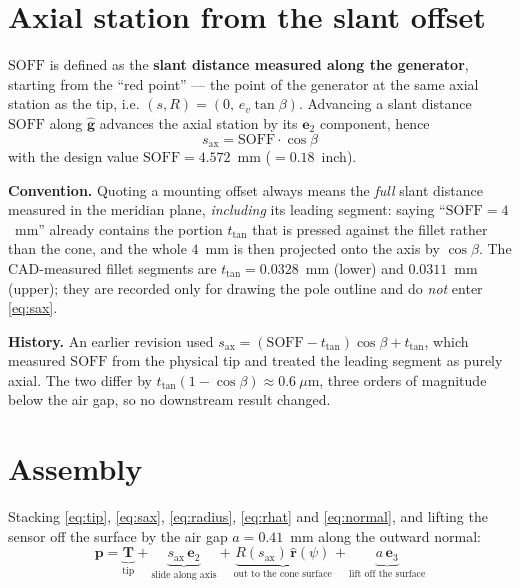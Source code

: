 \documentclass[12pt]{article}
\newcommand{\ehat}[1]{\mathbf{e}_{#1}}
\newcommand{\rhat}{\hat{\mathbf{r}}}
\begin{document}
\section{Axial station from the slant offset}

$\mathrm{SOFF}$ is defined as the \textbf{slant distance measured along the generator},
starting from the ``red point'' --- the point of the generator at the same axial station
as the tip, i.e. $(s,R)=(0,\,e_v\tan\beta)$. Advancing a slant distance
$\mathrm{SOFF}$ along $\hat{\mathbf{g}}$ advances the axial station by its $\ehat{2}$
component, hence
\begin{equation}
\boxed{\ s_{\mathrm{ax}}=\mathrm{SOFF}\cdot\cos\beta\ }
\label{eq:sax}
\end{equation}
with the design value $\mathrm{SOFF}=4.572$~mm ($=0.18$~inch).

\textbf{Convention.} Quoting a mounting offset always means the \emph{full} slant
distance measured in the meridian plane, \emph{including} its leading segment: saying
``$\mathrm{SOFF}=4$~mm'' already contains the portion $t_{\tan}$ that is pressed
against the fillet rather than the cone, and the whole $4$~mm is then projected onto
the axis by $\cos\beta$. The CAD-measured fillet segments are $t_{\tan}=0.0328$~mm
(lower) and $0.0311$~mm (upper); they are recorded only for drawing the pole outline
and do \emph{not} enter \eqref{eq:sax}.

\textbf{History.} An earlier revision used
$s_{\mathrm{ax}}=(\mathrm{SOFF}-t_{\tan})\cos\beta+t_{\tan}$, which measured
$\mathrm{SOFF}$ from the physical tip and treated the leading segment as purely
axial. The two differ by $t_{\tan}(1-\cos\beta)\approx0.6\ \mu$m, three orders of
magnitude below the air gap, so no downstream result changed.

\section{Assembly}

Stacking \eqref{eq:tip}, \eqref{eq:sax}, \eqref{eq:radius}, \eqref{eq:rhat} and
\eqref{eq:normal}, and lifting the sensor off the surface by the air gap
$a=0.41$~mm along the outward normal:
\begin{equation}
\boxed{\;
\mathbf{p}
=\underbrace{\mathbf{T}}_{\text{tip}}
+\underbrace{s_{\mathrm{ax}}\,\ehat{2}}_{\text{slide along axis}}
+\underbrace{R(s_{\mathrm{ax}})\,\rhat(\psi)}_{\text{out to the cone surface}}
+\underbrace{a\,\ehat{3}}_{\text{lift off the surface}}\;}
\label{eq:assembly}
\end{equation}
\end{document}
